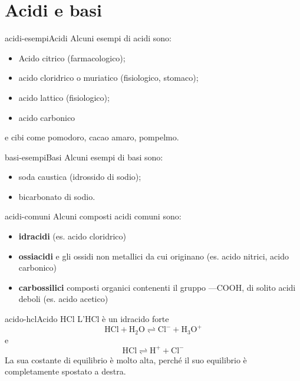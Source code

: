\documentclass[preview]{standalone}
\begin{document}
\genpage

\section{Acidi e basi}

\begin{snippetexample}{acidi-esempi}{Acidi}
    Alcuni esempi di acidi sono:
    \begin{itemize}
        \item Acido citrico (farmacologico);
        \item acido cloridrico o muriatico (fisiologico, stomaco);
        \item acido lattico (fisiologico);
        \item acido carbonico
    \end{itemize}
    e cibi come pomodoro, cacao amaro, pompelmo.
\end{snippetexample}

\begin{snippetexample}{basi-esempi}{Basi}
    Alcuni esempi di basi sono:
    \begin{itemize}
        \item soda caustica (idrossido di sodio);
        \item bicarbonato di sodio.
    \end{itemize}
\end{snippetexample}


\begin{snippet}{acidi-comuni}
    Alcuni composti acidi comuni sono:
    \begin{itemize}
        \item \textbf{idracidi} (es. acido cloridrico)
        \item \textbf{ossiacidi} e gli ossidi non metallici da cui originano (es. acido nitrici, acido carbonico)
        \item \textbf{carbossilici} composti organici contenenti il gruppo —COOH,
            di solito acidi deboli (es. acido acetico)
    \end{itemize}
\end{snippet}

\begin{snippetexample}{acido-hcl}{Acido HCl}
    L'HCl è un idracido forte
    \[
        \text{HCl} + \text{H}_2\text{O} \rightleftharpoons \text{Cl}^- + \text{H}_3\text{O}^+
    \]
    e
    \[
        \text{HCl} \rightleftharpoons \text{H}^+ + \text{Cl}^-
    \]
    La sua costante di equilibrio è molto alta, perché il suo equilibrio è completamente spostato a destra.
\end{snippetexample}
\end{document}
